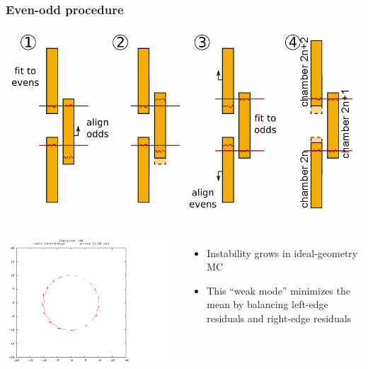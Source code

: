 \documentclass[compress]{beamer}
\begin{document}
\begin{frame}
\frametitle{Even-odd procedure}

\begin{center}
\includegraphics[width=0.6\linewidth]{even-odd.png}
\end{center}

\begin{columns}
\includegraphics[width=\linewidth]{beamhalo_APE_r0_t100000_Xf0mm_iter100.png}

\small
\begin{itemize}
\item Instability grows in ideal-geometry MC
\item This ``weak mode'' minimizes the mean by balancing left-edge residuals and right-edge residuals
\end{itemize}
\end{columns}
\end{frame}
\end{document}
